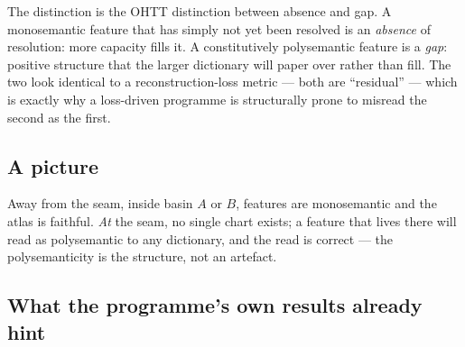 \documentclass[11pt,a4paper]{article}
\begin{document}
The distinction is the OHTT distinction between absence and gap. A monosemantic feature that has
simply not yet been resolved is an \emph{absence} of resolution: more capacity fills it. A
constitutively polysemantic feature is a \emph{gap}: positive structure that the larger
dictionary will paper over rather than fill. The two look identical to a reconstruction-loss
metric --- both are ``residual'' --- which is exactly why a loss-driven programme is structurally
prone to misread the second as the first.

\subsection{A picture}

\begin{center}
\end{center}

Away from the seam, inside basin $A$ or $B$, features are monosemantic and the atlas is faithful.
\emph{At} the seam, no single chart exists; a feature that lives there will read as polysemantic
to any dictionary, and the read is correct --- the polysemanticity is the structure, not an
artefact.

\subsection{What the programme's own results already hint}
\end{document}
